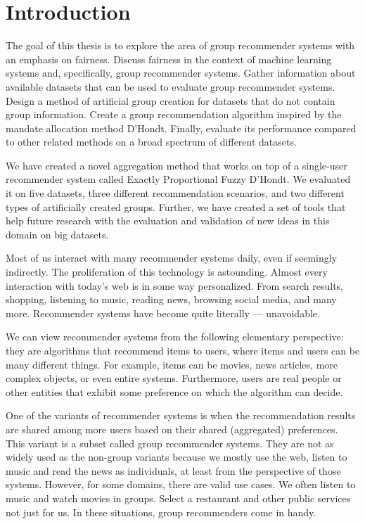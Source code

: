\chapter{Introduction}  \label{chap_introduction}

The goal of this thesis is to explore the area of group recommender systems with an emphasis on fairness. Discuss fairness in the context of machine learning systems and, specifically, group recommender systems. Gather information about available datasets that can be used to evaluate group recommender systems. Design a method of artificial group creation for datasets that do not contain group information. Create a group recommendation algorithm inspired by the mandate allocation method D'Hondt. Finally, evaluate its performance compared to other related methods on a broad spectrum of different datasets.

We have created a novel aggregation method that works on top of a single-user recommender system called Exactly Proportional Fuzzy D'Hondt. We evaluated it on five datasets, three different recommendation scenarios, and two different types of artificially created groups. Further, we have created a set of tools that help future research with the evaluation and validation of new ideas in this domain on big datasets.


Most of us interact with many recommender systems daily, even if seemingly indirectly. The proliferation of this technology is astounding. Almost every interaction with today's web is in some way personalized. From search results, shopping, listening to music, reading news, browsing social media, and many more. Recommender systems have become quite literally --- unavoidable.

We can view recommender systems from the following elementary perspective: they are algorithms that recommend items to users, where items and users can be many different things. For example, items can be movies, news articles, more complex objects, or even entire systems. Furthermore, users are real people or other entities that exhibit some preference on which the algorithm can decide.

One of the variants of recommender systems is when the recommendation results are shared among more users based on their shared (aggregated) preferences. This variant is a subset called group recommender systems. They are not as widely used as the non-group variants because we mostly use the web, listen to music and read the news as individuals, at least from the perspective of those systems. However, for some domains, there are valid use cases. We often listen to music and watch movies in groups. Select a restaurant and other public services not just for us. In these situations, group recommenders come in handy.

